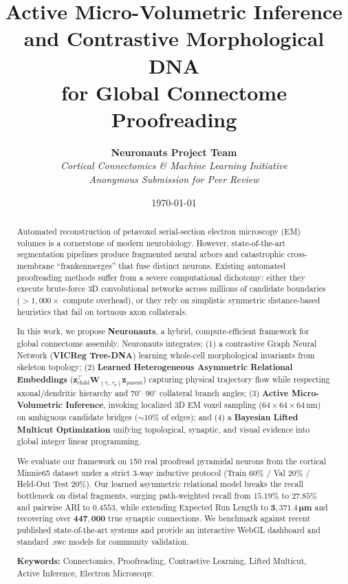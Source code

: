 \documentclass[10pt,twocolumn,letterpaper]{article}
\title{\textbf{\Large Active Micro-Volumetric Inference and Contrastive Morphological DNA \\ for Global Connectome Proofreading}}
\author{
  \textbf{Neuronauts Project Team} \\
  \textit{Cortical Connectomics \& Machine Learning Initiative} \\
  \textit{Anonymous Submission for Peer Review}
}
\date{\today}
\begin{document}
\maketitle

\begin{abstract}
\noindent Automated reconstruction of petavoxel serial-section electron microscopy (EM) volumes is a cornerstone of modern neurobiology. However, state-of-the-art segmentation pipelines produce fragmented neural arbors and catastrophic cross-membrane ``frankenmerges'' that fuse distinct neurons. Existing automated proofreading methods suffer from a severe computational dichotomy: either they execute brute-force 3D convolutional networks across millions of candidate boundaries ($>1,000\times$ compute overhead), or they rely on simplistic symmetric distance-based heuristics that fail on tortuous axon collaterals. 

In this work, we propose \textbf{Neuronauts}, a hybrid, compute-efficient framework for global connectome assembly. Neuronauts integrates: (1) a contrastive Graph Neural Network (\textbf{VICReg Tree-DNA}) learning whole-cell morphological invariants from skeleton topology; (2) \textbf{Learned Heterogeneous Asymmetric Relational Embeddings} ($\mathbf{z}_{\text{child}}^\top \mathbf{W}_{(\tau_c, \tau_p)} \mathbf{z}_{\text{parent}}$) capturing physical trajectory flow while respecting axonal/dendritic hierarchy and $70^\circ\text{--}90^\circ$ collateral branch angles; (3) \textbf{Active Micro-Volumetric Inference}, invoking localized 3D EM voxel sampling ($64 \times 64 \times 64\,\text{nm}$) on ambiguous candidate bridges ($\sim 10\%$ of edges); and (4) a \textbf{Bayesian Lifted Multicut Optimization} unifying topological, synaptic, and visual evidence into global integer linear programming.

We evaluate our framework on 150 real proofread pyramidal neurons from the cortical Minnie65 dataset under a strict 3-way inductive protocol (Train 60\% / Val 20\% / Held-Out Test 20\%). Our learned asymmetric relational model breaks the recall bottleneck on distal fragments, surging path-weighted recall from $15.19\%$ to $\mathbf{27.85\%}$ and pairwise ARI to $\mathbf{0.4553}$, while extending Expected Run Length to $\mathbf{3,371.4\,\mu\text{m}}$ and recovering over $\mathbf{447,000}$ true synaptic connections. We benchmark against recent published state-of-the-art systems and provide an interactive WebGL dashboard and standard \textsf{.swc} models for community validation.
\vspace{0.2cm}

\noindent\textbf{Keywords:} Connectomics, Proofreading, Contrastive Learning, Lifted Multicut, Active Inference, Electron Microscopy.
\end{abstract}
\end{document}
